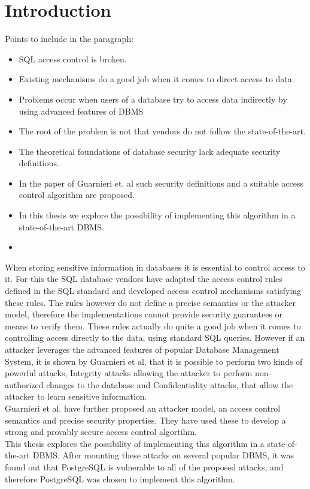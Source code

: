 \section{Introduction}

Points to include in the paragraph:

\begin{itemize}
	\item SQL access control is broken.
	\item Existing mechanisms do a good job when it comes to direct access to data.
	\item Problems occur when users of a database try to access data indirectly by using advanced features of DBMS
	\item The root of the problem is not that vendors do not follow the state-of-the-art.
	\item The theoretical foundations of database security lack adequate security definitions.
	\item In the paper of Guarnieri et. al such security definitions and a suitable access control algorithm are proposed.
	\item In this thesis we explore the possibility of implementing this algorithm in a state-of-the-art DBMS.
	\item 
\end{itemize}

When storing sensitive information in databases it is essential to control access to it. For this the SQL database vendors have adapted the access control rules defined in the SQL standard and developed access control mechanisms satisfying these rules. The rules however do not define a precise semantics or the attacker model, therefore the implementations cannot provide security guarantees or means to verify them.
These rules actually do quite a good job when it comes to controlling access directly to the data, using standard SQL queries. However if an attacker leverages the advanced features of popular Database Management System, it is shown by Guarnieri et al. that it is possible to perform two kinds of powerful attacks, Integrity attacks allowing the attacker to perform non-authorized changes to the database and Confidentiality attacks, that allow the attacker to learn sensitive information.\\
Guarnieri et al. have further proposed an attacker model, an access control semantics and precise security properties. They have used these to develop a strong and provably secure access control algortihm.\\
This thesis explores the possibility of implementing this algorithm in a state-of-the-art DBMS. After mounting these attacks on several popular DBMS, it was found out that PostgreSQL is vulnerable to all of the proposed attacks, and therefore PostgreSQL was chosen to implement this algorithm.